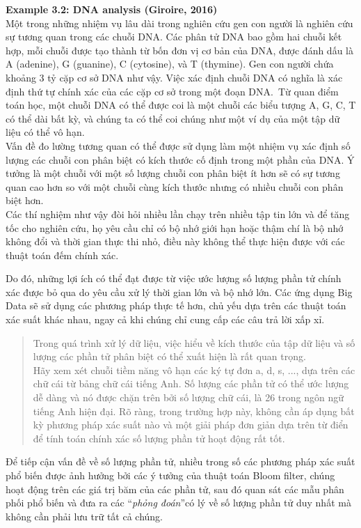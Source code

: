 \documentclass[a4paper,13pt]{article}
\theoremstyle{mytheor}
\begin{document}
\begin{mdframed}
    \textbf{Example 3.2: DNA analysis (Giroire, 2016)}\\
    Một trong những nhiệm vụ lâu dài trong nghiên cứu gen con người là nghiên cứu sự tương quan trong các chuỗi DNA. Các phân tử DNA 
    bao gồm hai chuỗi kết hợp, mỗi chuỗi được tạo thành từ bốn đơn vị cơ bản của DNA, được đánh dấu là A (adenine), G (guanine), C (cytosine), và T (thymine). Gen con người chứa khoảng 3 tỷ cặp cơ sở DNA như vậy. Việc xác định chuỗi DNA có nghĩa là xác định thứ tự chính xác của các cặp cơ sở trong một đoạn DNA.\
    Từ quan điểm toán học, một chuỗi DNA có thể được coi là một chuỗi các biểu tượng A, G, C, T có thể dài bất kỳ, và chúng ta có thể coi chúng như 
    một ví dụ của một tập dữ liệu có thể vô hạn.\\
    Vấn đề đo lường tương quan có thể được sử dụng làm một nhiệm vụ xác định số lượng các chuỗi con phân biệt có kích thước cố định trong một phần của DNA. 
    Ý tưởng là một chuỗi với một số lượng chuỗi con phân biệt ít hơn sẽ có sự tương quan cao hơn so với một chuỗi cùng kích thước nhưng có nhiều chuỗi con 
    phân biệt hơn.\\
    Các thí nghiệm như vậy đòi hỏi nhiều lần chạy trên nhiều tập tin lớn và để tăng tốc cho nghiên cứu, họ yêu cầu chỉ có bộ nhớ giới hạn hoặc thậm chí 
    là bộ nhớ không đổi và thời gian thực thi nhỏ, điều này không thể thực hiện được với các thuật toán đếm chính xác.
\end{mdframed}
Do đó, những lợi ích có thể đạt được từ việc ước lượng số lượng phần tử chính xác được bỏ qua do yêu cầu xử lý thời gian lớn và bộ nhớ lớn. 
Các ứng dụng Big Data sẽ sử dụng các phương pháp thực tế hơn, chủ yếu dựa trên các thuật toán xác suất khác nhau, ngay cả khi chúng chỉ cung cấp 
các câu trả lời xấp xỉ.\\
\vspace{0.5cm}
\begin{quote}
    Trong quá trình xử lý dữ liệu, việc hiểu về kích thước của tập dữ liệu và số lượng các phần tử phân biệt có thể xuất hiện là rất quan trọng.\\
    Hãy xem xét chuỗi tiềm năng vô hạn các ký tự đơn a, d, s, ..., dựa trên các chữ cái từ bảng chữ cái tiếng Anh. 
    Số lượng các phần tử có thể ước lượng dễ dàng và nó được chặn trên bởi số lượng chữ cái, là 26 trong ngôn ngữ tiếng Anh hiện đại. 
    Rõ ràng, trong trường hợp này, không cần áp dụng bất kỳ phương pháp xác suất nào và một giải pháp đơn giản dựa trên từ điển để tính toán chính xác 
    số lượng phần tử hoạt động rất tốt.\\
\end{quote}
\indent Để tiếp cận vấn đề về số lượng phần tử, nhiều trong số các phương pháp xác suất phổ biến được ảnh hưởng bởi các ý tưởng của thuật toán Bloom filter, 
chúng hoạt động trên các giá trị băm của các phần tử, sau đó quan sát các mẫu phân phối phổ biến và đưa ra các \textquotedblleft\textit{phỏng đoán}\textquotedblright có lý về số lượng 
phần tử duy nhất mà không cần phải lưu trữ tất cả chúng.
\end{document}

